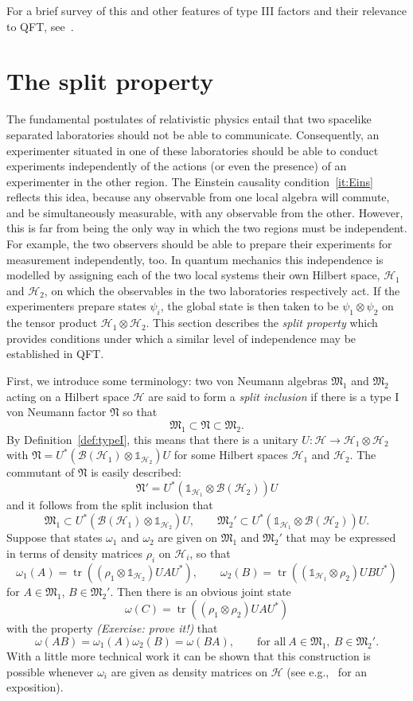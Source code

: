 \documentclass[12pt]{article}
\newcommand{\1}{\mathds{1}}                         %
\newcommand{\BB}{{\mathcal{B}}}
\newcommand{\HH}{{\mathcal{H}}}
\newcommand{\Mf}{{\mathfrak{M}}}
\newcommand{\Nf}{{\mathfrak{N}}}
\newcommand{\II}{{\mathbb{1}}}
\DeclareMathOperator{\tr}{tr}
\begin{document}
For a brief survey of this and other features of type III factors and their relevance to QFT, see~\cite{Yngvason:2005,Yngvason:2015}. 

 
\section{The split property}\label{sec:split}

The fundamental postulates of relativistic physics entail that two spacelike separated laboratories should not be able to communicate. Consequently,
an experimenter situated in one of these laboratories should be able to conduct experiments independently of the actions (or even the presence) of an experimenter in the other region. The Einstein causality condition~\ref{it:Eins} reflects this idea, because any observable
from one local algebra will commute, and be simultaneously measurable, with any observable from the other.  However, this is far from being the only way in which the two regions must be independent. For example, the two observers should be able to prepare their experiments for measurement independently, too.
In quantum mechanics this independence is modelled by assigning each of the two local systems their own Hilbert space, $\HH_1$ and $\HH_2$, on which the observables in the two laboratories respectively act. If the experimenters prepare states $\psi_i$, the global state is then taken to be $\psi_1\otimes\psi_2$ on the tensor product $\HH_1\otimes\HH_2$. 
This section describes the \emph{split property} which provides conditions under which a similar level of independence may be established in QFT.

First, we introduce some terminology: two von Neumann algebras $\Mf_1$ and $\Mf_2$ acting on a Hilbert space $\HH$ are said to form a \emph{split inclusion} if there is a type I von Neumann factor $\Nf$ so that
\[
\Mf_1\subset \Nf\subset \Mf_2.
\]
By Definition~\ref{def:typeI}, this means that there is a unitary $U:\HH\to \HH_1\otimes\HH_2$ with $\Nf = U^* (\BB(\HH_1)\otimes\II_{\HH_2})U$ for some Hilbert spaces $\HH_1$ and $\HH_2$. The commutant of $\Nf$ is easily described:
\[
\Nf' = U^* (\II_{\HH_1}\otimes\BB(\HH_2))U
\]
and it follows from the split inclusion that
\[
\Mf_1\subset  U^* (\BB(\HH_1)\otimes\II_{\HH_2})U,\qquad   \Mf_2' \subset U^* (\II_{\HH_1}\otimes\BB(\HH_2))U.
\]
Suppose that states $\omega_1$ and $\omega_2$ are given on $\Mf_1$ and $\Mf_2'$ that may be expressed in terms of density matrices $\rho_i$ on $\HH_i$, so that
\[
\omega_1(A)= \tr ((\rho_1\otimes\II_{\HH_2})UAU^*), \qquad \omega_2(B)= \tr ((\II_{\HH_1}\otimes\rho_2)UBU^*)
\]
for $A\in\Mf_1$, $B\in\Mf_2'$. Then there is an obvious joint state
\[
\omega(C) = \tr ((\rho_1\otimes\rho_2)UAU^*)
\]
with the property \emph{(Exercise: prove it!)} that
\[
\omega(AB)= \omega_1(A)\omega_2(B) = \omega(BA), \qquad \text{for all}~A\in\Mf_1, ~B\in\Mf_2'.
\]
With a little more technical work it can be shown that this construction is possible whenever $\omega_i$ are given as density matrices on $\HH$ (see e.g.,~\cite{Fewster_Abh:2016} for an exposition). 
\end{document}
